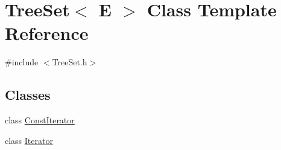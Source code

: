 \hypertarget{class_tree_set}{
\section{TreeSet$<$ E $>$ Class Template Reference}
\label{class_tree_set}
}


{\ttfamily \#include $<$TreeSet.h$>$}

\subsection*{Classes}
\begin{DoxyCompactItemize}
\item 
class \hyperlink{class_tree_set_1_1_const_iterator}{ConstIterator}
\item 
class \hyperlink{class_tree_set_1_1_iterator}{Iterator}
\end{DoxyCompactItemize}
